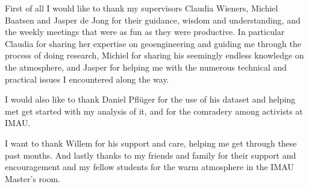 First of all I would like to thank my supervisors Claudia Wieners, Michiel Baatsen and Jasper de Jong for their guidance, wisdom and understanding, and the weekly meetings that were as fun as they were productive. In particular Claudia for sharing her expertise on geoengineering and guiding me through the process of doing research, Michiel for sharing his seemingly endless knowledge on the atmosphere, and Jasper for helping me with the numerous technical and practical issues I encountered along the way.

I would also like to thank Daniel Pfl\"uger for the use of his dataset and helping met get started with my analysis of it, and for the comradery among activists at IMAU. 

I want to thank Willem for his support and care, helping me get through these past months. And lastly thanks to my friends and family for their support and encouragement and my fellow students for the warm atmosphere in the IMAU Master's room.